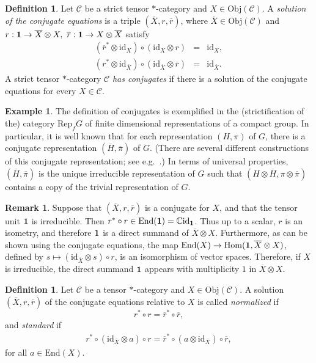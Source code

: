 \documentclass[11pt]{article}
\theoremstyle{definition}
\theoremstyle{definition}
\newtheorem{defn}[thm]{Definition}
\newtheorem{example}[thm]{Example}
\newtheorem{note}[thm]{Remark}
\theoremstyle{remark}
\newcommand{\Obj}{\mathrm{Obj}}
\def\2#1{{\mathcal #1}}
\def\7#1{{\mathbb #1}}
\def\1#1{{\bf #1}}
\def\ol#1{{\overline #1}}
\newcommand{\Hom}{\mathrm{Hom}}
\newcommand{\End}{\mathrm{End}}
\newcommand{\Rep}{\mathrm{Rep}}
\newcommand{\rarr}{\rightarrow}
\def\id{\mathrm{id}}
\begin{document}
\begin{defn} Let $\2C$ be a strict tensor $*$-category
  and $X\in\Obj (\2C )$. A \emph{solution of the
    conjugate equations} is a triple
  $(\overline{X},r,\overline{r})$, where
  $\overline{X}\in\Obj (\2C )$ and $r:\11\rarr
  \overline{X}\otimes X,\ \overline{r}:\11\rarr
  X\otimes\overline{X}$ satisfy
\begin{eqnarray*}
  (\overline{r}^*\otimes\id_X )\circ (\id_X\otimes r) &=&\id_X, \\
  (r^*\otimes\id_{\overline{X}})\circ (\id_{\overline{X}}\otimes\overline{r}) 
  &=&\id_{\overline{X}}.
\end{eqnarray*}
A strict tensor $*$-category $\2C$ \emph{has
  conjugates} if there is a solution of the conjugate
equations for every $X\in\2C$.
\end{defn}


\begin{example} The definition of conjugates is
  exemplified in the (strictification of the) category
  $\Rep _fG$ of finite dimensional representations of a
  compact group.  In particular, it is well known that
  for each representation $(H, \pi)$ of $G$, there is a
  conjugate representation $(\ol H ,\ol\pi )$ of $G$.
  (There are several different constructions of this
  conjugate representation; see e.g.\ \cite[p.\
  30]{simon}.)  In terms of universal properties, $(\ol
  H,\ol\pi )$ is the unique irreducible representation
  of $G$ such that $(H\otimes \ol H ,\pi \otimes \ol\pi
  )$ contains a copy of the trivial representation of
  $G$.
\end{example}

\begin{note} Suppose that $(\ol X,r,\ol r)$ is a
  conjugate for $X$, and that the tensor unit $\11$ is
  irreducible.  Then $r^*\circ r\in \End (\11 )=\7C \id
  _{\11}$.  Thus up to a scalar, $r$ is an isometry,
  and therefore $\11$ is a direct summand of $\ol
  X\otimes X$.  Furthermore, as can be shown using the
  conjugate equations, the map $\End (X)\to \Hom (\11
  ,\ol X\otimes X)$, defined by $s\mapsto (\id _{\ol
    X}\otimes s )\circ r$, is an isomorphism of vector
  spaces.  Therefore, if $X$ is irreducible, the direct
  summand $\11$ appears with multiplicity $1$ in $\ol
  X\otimes X$.
  \label{multiplicity}
\end{note}


\begin{defn} Let $\2C$ be a tensor $*$-category and
  $X\in \Obj (\2C )$.  A solution $(\ol X,r,\ol r)$ of
  the conjugate equations relative to $X$ is called
  \emph{normalized} if
$$ r^*\circ r = \ol r^*\circ \ol r ,$$
and \emph{standard} if
\begin{eqnarray*} 
  r^*\circ (\id _{\ol X}\otimes a)\circ r =\ol r^* \circ (a\otimes \id _{\ol X})\circ
  \ol r ,\end{eqnarray*}
for all $a\in \End (X)$.  
\end{defn}
\end{document}
